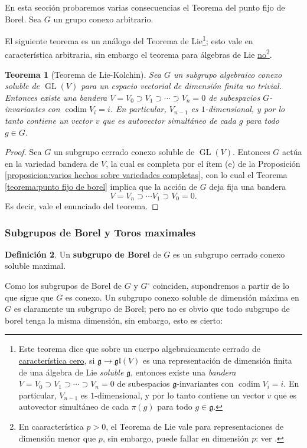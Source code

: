 \documentclass[spanish,10pt]{amsart}
\newtheorem{theorem}{Teorema}[section]
\theoremstyle{definition}
\newtheorem{definition}[theorem]{Definición}
\theoremstyle{remark}
\numberwithin{equation}{section}
\begin{document}
En esta sección probaremos varias consecuencias el Teorema del punto fijo de Borel. Sea $G$ un grupo conexo arbitrario.

El siguiente teorema es un análogo del Teorema de Lie\footnote{Este teorema dice que sobre un cuerpo algebraicamente cerrado de \underline{característica cero}, si $\mathfrak g \to \mathfrak {gl} (V)$ es una representación de dimensión finita de una álgebra de Lie \textit{soluble} $\mathfrak g$, entonces existe una \textit{bandera} $V = V_0 \supset V_1 \supset \cdots \supset V_n = 0$ de subespacios $\mathfrak g$-invariantes con $\operatorname{codim} V_i = i$. En particular, $V_{n-1}$ es $1$-dimensional, y por lo tanto contiene un vector $v$ que es autovector simultáneo de cada $\pi (g)$ para todo $g \in \mathfrak g$.}; esto vale en característica arbitraria, sin embargo el teorema para álgebras de Lie \underline{no}\footnote{En caaracterística $p > 0$, el Teorema de Lie vale para representaciones de dimensión menor que $p$, sin embargo, puede fallar en dimensión $p$: ver \cite{wikipedia-lie-theorem}.}.
\begin{theorem}[Teorema de Lie-Kolchin]\label{teorema:Lie-Kolchin}
Sea $G$ un subgrupo algebraico conexo soluble de $\operatorname{GL} (V)$ para un espacio vectorial de dimensión finita no trivial. Entonces existe una bandera $V = V_0 \supset V_1 \supset \cdots \supset V_n = 0$ de subespacios $G$-invariantes con $\operatorname{codim} V_i = i$. En particular, $V_{n-1}$ es $1$-dimensional, y por lo tanto contiene un vector $v$ que es autovector simultáneo de cada $g$ para todo $g \in G$.
\end{theorem}
\begin{proof}
Sea $G$ un subgrupo cerrado conexo soluble de $\operatorname{GL} (V)$. Entonces $G$ actúa en la variedad bandera de $V$, la cual es completa por el ítem (e) de la Proposición \ref{proposicion:varios hechos sobre variedades completas}, con lo cual el Teorema \ref{teorema:punto fijo de borel} implica que la acción de $G$ deja fija una bandera
\[
    V = V_n \supset \cdots V_1 \supset V_0 = 0.
\]
Es decir, vale el enunciado del teorema.
\end{proof}

\subsubsection{Subgrupos de Borel y Toros maximales}

\begin{definition}
Un \textbf{subgrupo de Borel} de $G$ es un subgrupo cerrado conexo soluble maximal.
\end{definition}
Como los subgrupos de Borel de $G$ y $G^{\circ}$ coinciden, supondremos a partir de lo que sigue que $G$ es conexo. Un subgrupo conexo soluble de dimensión máxima en $G$ es claramente un subgrupo de Borel; pero no es obvio que todo subgrupo de borel tenga la misma dimensión, sin embargo, esto es cierto:
\end{document}
